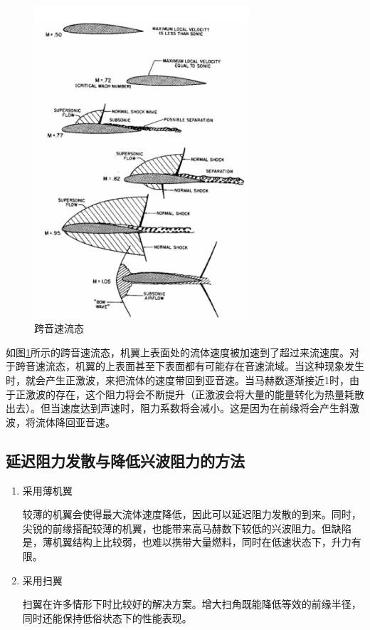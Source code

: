 \begin{figure}[!ht]
    \centering
    \includegraphics[width=8cm]{figures/23.png}
    \caption{跨音速流态}
    \label{23}
\end{figure}

如图\ref{23}所示的跨音速流态，机翼上表面处的流体速度被加速到了超过来流速度。对于跨音速流态，机翼的上表面甚至下表面都有可能存在音速流域。当这种现象发生时，就会产生正激波，来把流体的速度带回到亚音速。当马赫数逐渐接近1时，由于正激波的存在，这个阻力将会不断提升（正激波会将大量的能量转化为热量耗散出去）。但当速度达到声速时，阻力系数将会减小。这是因为在前缘将会产生斜激波，将流体降回亚音速。

\subsection{延迟阻力发散与降低兴波阻力的方法}

\begin{enumerate}
    \item 采用薄机翼
    
    较薄的机翼会使得最大流体速度降低，因此可以延迟阻力发散的到来。同时，尖锐的前缘搭配较薄的机翼，也能带来高马赫数下较低的兴波阻力。但缺陷是，薄机翼结构上比较弱，也难以携带大量燃料，同时在低速状态下，升力有限。

    \item 采用扫翼
    
    扫翼在许多情形下时比较好的解决方案。增大扫角既能降低等效的前缘半径，同时还能保持低俗状态下的性能表现。
\end{enumerate}
